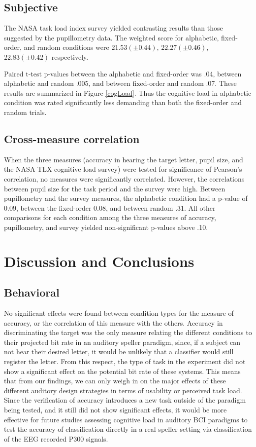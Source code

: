 \documentclass[10pt]{article}
\begin{document}
\subsection{Subjective}

The NASA task load index survey yielded contrasting results
than those suggested by the pupillometry data.  The weighted
score for alphabetic, fixed-order, and random conditions were
$21.53 (\pm 0.44)$, $22.27 (\pm 0.46)$, $22.83 (\pm 0.42)$
respectively.

Paired t-test p-values between the alphabetic and fixed-order was
.04, between alphabetic and random .005, and between fixed-order
and random .07.  These results are summarized in Figure
\ref{cogLoad}.  Thus the cognitive load in alphabetic condition was
rated significantly less demanding than both the fixed-order and
random trials.

\subsection{Cross-measure correlation} 
When the three measures
(accuracy in hearing the target letter, pupil size, and the NASA TLX
cognitive load survey) were tested for significance of Pearson's
correlation, no measures were significantly correlated.  However,
the correlations between pupil size for the task period and the
survey were high.  Between pupillometry and the survey measures,
the alphabetic condition had a p-value of 0.09, between the
fixed-order 0.08, and between random .31.  All other comparisons
for each condition among the three measures of accuracy, pupillometry, and survey
yielded non-significant p-values above .10.

\section{Discussion and Conclusions}

\subsection{Behavioral}

No significant effects were found between condition types for
the measure of accuracy, or the correlation of this measure
with the others.  Accuracy in discriminating the target was
the only measure relating the different conditions to their
projected bit rate in an auditory speller paradigm, since, if
a subject can not hear their desired letter, it would be
unlikely that a classifier would still register the letter.
From this respect, the type of task in the experiment did not
show a significant effect on the potential bit rate of these
systems. This means that from our findings, we can only weigh
in on the major effects of these different auditory design
strategies in terms of usability or perceived task load. Since
the verification of accuracy introduces a new task outside of
the paradigm being tested, and it still did not show
significant effects, it would be more effective for future
studies assessing cognitive load in auditory BCI paradigms to
test the accuracy of classification directly in a real speller
setting via classification of the EEG recorded P300 signals.
\end{document}
